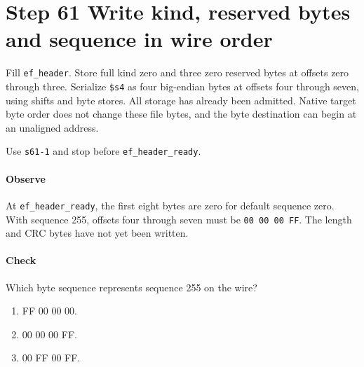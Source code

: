 \section{Step 61 Write kind, reserved bytes and sequence in wire order}
Fill \texttt{ef\_header}. Store full kind zero and three zero reserved bytes at offsets zero through three. Serialize \texttt{\$s4} as four big-endian bytes at offsets four through seven, using shifts and byte stores. All storage has already been admitted. Native target byte order does not change these file bytes, and the byte destination can begin at an unaligned address.

Use \texttt{s61-1} and stop before \texttt{ef\_header\_ready}.

\paragraph{Observe} At \texttt{ef\_header\_ready}, the first eight bytes are zero for default sequence zero. With sequence 255, offsets four through seven must be \texttt{00 00 00 FF}. The length and CRC bytes have not yet been written.

\paragraph{Check} Which byte sequence represents sequence 255 on the wire?
\begin{enumerate}[label=\Alph*.]
  \item FF 00 00 00.
  \item 00 00 00 FF.
  \item 00 FF 00 FF.
\end{enumerate}
